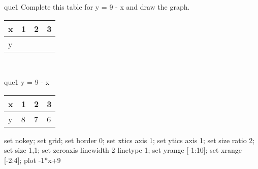 \documentclass[13.5pt, varwidth=true]{beamer}
\begin{document}
\begin{frame}[shrink=19,fragile]
	\begin{beamercolorbox}[rounded=true, left, shadow=true,wd=14.8cm]{que1}
		 Complete this table for y = 9 - x and draw the graph. \\[0.3cm] \renewcommand{\arraystretch}{1.2}\begin{tabular}{|C|C|C|C|} \hline x & 1 & 2 & 3 \\ \hline y & & & \\ \hline \end{tabular}\\[0.3cm]
	\end{beamercolorbox}
\end{frame}
\begin{frame}[shrink=19,fragile]
	\begin{beamercolorbox}[rounded=true, left, shadow=true,wd=14.8cm]{que1}
		y = 9 - x\renewcommand{\arraystretch}{1.2}\begin{tabular}{|C|C|C|C|} \hline x & 1 & 2 & 3 \\ \hline y & 8 & 7 & 6\\ \hline \end{tabular}\begin{gnuplot}[terminal=pdf] set nokey; set grid; set border 0; set xtics axis 1; set ytics axis 1; set size ratio 2; set size 1,1; set zeroaxis linewidth 2 linetype 1; set yrange [-1:10]; set xrange [-2:4]; plot -1*x+9 \end{gnuplot}
	\end{beamercolorbox}
\end{frame}
\end{document}
